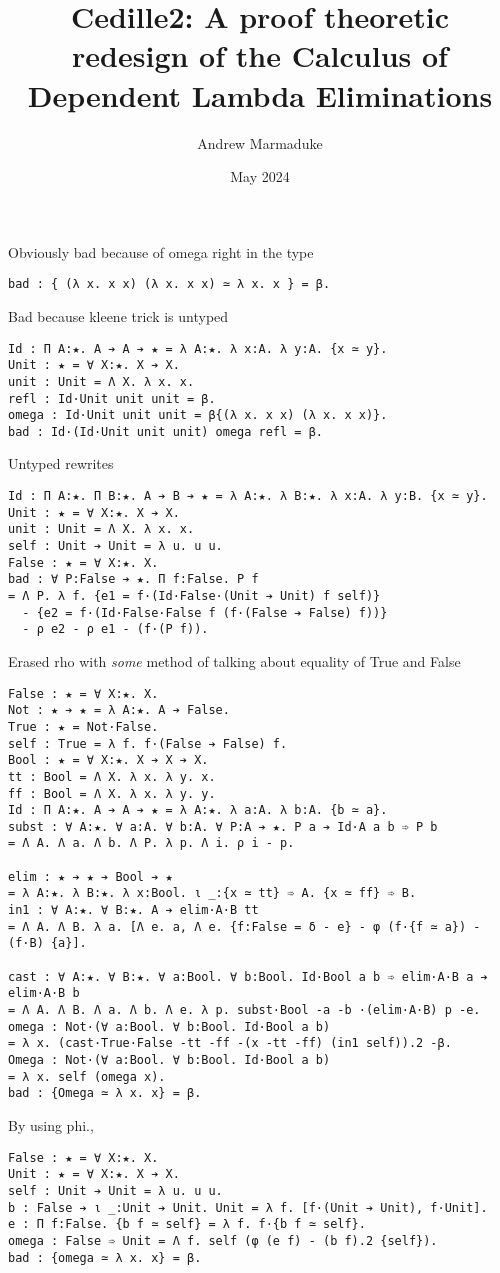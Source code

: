 \documentclass[letterpaper, 11pt]{uiowa-thesis}
\title{Cedille2: A proof theoretic redesign of the Calculus of Dependent Lambda Eliminations}
\author{Andrew Marmaduke}
\date{May 2024}
\begin{document}

Obviously bad because of omega right in the type
\begin{verbatim}
bad : { (λ x. x x) (λ x. x x) ≃ λ x. x } = β.
\end{verbatim}

Bad because kleene trick is untyped
\begin{verbatim}
Id : Π A:★. A ➔ A ➔ ★ = λ A:★. λ x:A. λ y:A. {x ≃ y}.
Unit : ★ = ∀ X:★. X ➔ X.
unit : Unit = Λ X. λ x. x.
refl : Id·Unit unit unit = β.
omega : Id·Unit unit unit = β{(λ x. x x) (λ x. x x)}.
bad : Id·(Id·Unit unit unit) omega refl = β.
\end{verbatim}

Untyped rewrites
\begin{verbatim}
Id : Π A:★. Π B:★. A ➔ B ➔ ★ = λ A:★. λ B:★. λ x:A. λ y:B. {x ≃ y}.
Unit : ★ = ∀ X:★. X ➔ X.
unit : Unit = Λ X. λ x. x.
self : Unit ➔ Unit = λ u. u u.
False : ★ = ∀ X:★. X.
bad : ∀ P:False ➔ ★. Π f:False. P f
= Λ P. λ f. {e1 = f·(Id·False·(Unit ➔ Unit) f self)}
  - {e2 = f·(Id·False·False f (f·(False ➔ False) f))}
  - ρ e2 - ρ e1 - (f·(P f)).
\end{verbatim}

Erased rho with \textit{some} method of talking about equality of True and False
\begin{verbatim}
False : ★ = ∀ X:★. X.
Not : ★ ➔ ★ = λ A:★. A ➔ False.
True : ★ = Not·False.
self : True = λ f. f·(False ➔ False) f.
Bool : ★ = ∀ X:★. X ➔ X ➔ X.
tt : Bool = Λ X. λ x. λ y. x.
ff : Bool = Λ X. λ x. λ y. y.
Id : Π A:★. A ➔ A ➔ ★ = λ A:★. λ a:A. λ b:A. {b ≃ a}.
subst : ∀ A:★. ∀ a:A. ∀ b:A. ∀ P:A ➔ ★. P a ➔ Id·A a b ➾ P b
= Λ A. Λ a. Λ b. Λ P. λ p. Λ i. ρ i - p.

elim : ★ ➔ ★ ➔ Bool ➔ ★
= λ A:★. λ B:★. λ x:Bool. ι _:{x ≃ tt} ➾ A. {x ≃ ff} ➾ B.
in1 : ∀ A:★. ∀ B:★. A ➔ elim·A·B tt
= Λ A. Λ B. λ a. [Λ e. a, Λ e. {f:False = δ - e} - φ (f·{f ≃ a}) - (f·B) {a}].

cast : ∀ A:★. ∀ B:★. ∀ a:Bool. ∀ b:Bool. Id·Bool a b ➾ elim·A·B a ➔ elim·A·B b
= Λ A. Λ B. Λ a. Λ b. Λ e. λ p. subst·Bool -a -b ·(elim·A·B) p -e.
omega : Not·(∀ a:Bool. ∀ b:Bool. Id·Bool a b)
= λ x. (cast·True·False -tt -ff -(x -tt -ff) (in1 self)).2 -β.
Omega : Not·(∀ a:Bool. ∀ b:Bool. Id·Bool a b)
= λ x. self (omega x).
bad : {Omega ≃ λ x. x} = β.
\end{verbatim}

By using phi.,

\begin{verbatim}
False : ★ = ∀ X:★. X.
Unit : ★ = ∀ X:★. X ➔ X.
self : Unit ➔ Unit = λ u. u u.
b : False ➔ ι _:Unit ➔ Unit. Unit = λ f. [f·(Unit ➔ Unit), f·Unit].
e : Π f:False. {b f ≃ self} = λ f. f·{b f ≃ self}.
omega : False ➾ Unit = Λ f. self (φ (e f) - (b f).2 {self}).
bad : {omega ≃ λ x. x} = β.
\end{verbatim}
\end{document}
